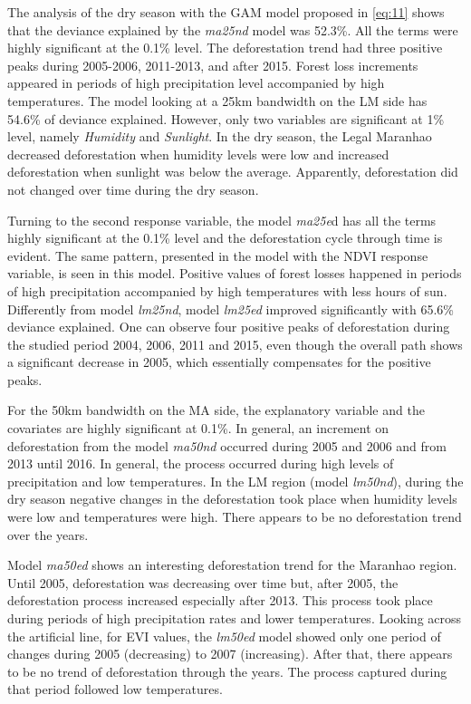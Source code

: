 The analysis of the dry season with the GAM model proposed in \ref{eq:11} shows that the deviance explained by the \textit{ma25nd} model was 52.3\%. All the terms were highly significant at the 0.1\% level. The deforestation trend had three positive peaks during 2005-2006, 2011-2013, and after 2015. Forest loss increments appeared in periods of high precipitation level accompanied by high temperatures. The model looking at a 25km bandwidth on the LM side has 54.6\% of deviance explained. However, only two variables are significant at 1\% level, namely \textit{Humidity} and \textit{Sunlight}. In the dry season, the Legal Maranhao decreased deforestation when humidity levels were low and increased deforestation when sunlight was below the average. Apparently, deforestation did not changed over time during the dry season. 

Turning to the second response variable, the model \textit{ma25e}d has all the terms highly significant at the 0.1\% level and the deforestation cycle through time is evident. The same pattern, presented in the model with the NDVI response variable, is seen in this model. Positive values of forest losses happened in periods of high precipitation accompanied by high temperatures with less hours of sun. Differently from model \textit{lm25nd}, model \textit{lm25ed} improved significantly with 65.6\% deviance explained. One can observe four positive peaks of deforestation during the studied period 2004, 2006, 2011 and 2015, even though the overall path shows a significant decrease in 2005, which essentially compensates for the positive peaks. 

For the 50km bandwidth on the MA side, the explanatory variable and the covariates are highly significant at 0.1\%. In general, an increment on deforestation from the model \textit{ma50nd} occurred during 2005 and 2006 and from 2013 until 2016. In general, the process occurred during high levels of precipitation and low temperatures. In the LM region (model \textit{lm50nd}), during the dry season negative changes in the deforestation  took place when humidity levels were low and temperatures were high. There appears to be no deforestation trend over the years.  

Model \textit{ma50ed} shows an interesting deforestation trend for the Maranhao region. Until 2005, deforestation was decreasing over time but, after 2005, the deforestation process increased especially after 2013. This process took place during periods of high precipitation rates and lower temperatures. Looking across the artificial line, for EVI values, the \textit{lm50ed} model showed only one period of changes during 2005 (decreasing) to 2007 (increasing). After that, there appears to be no trend of deforestation through the years. The process captured during that period followed low temperatures.  

